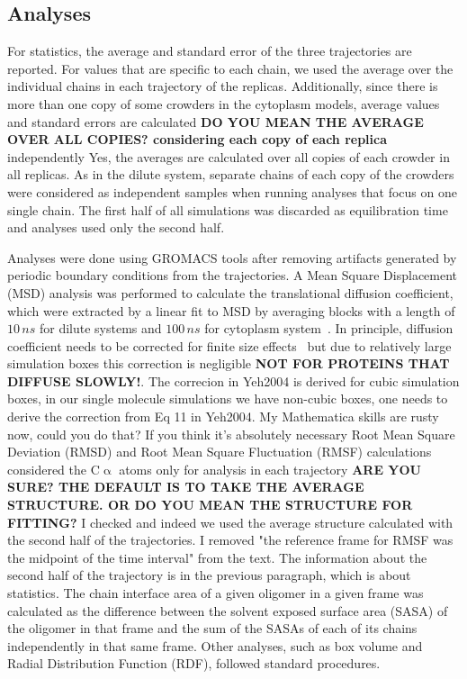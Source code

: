\documentclass[journal=jcisd8,manuscript=article]{achemso}
\begin{document}
\subsection{Analyses}
For statistics, the average and standard error of the three trajectories are reported. For values that
are specific to each chain, we used the average over the individual
chains in each trajectory of the replicas. Additionally, since there
is more than one copy of some crowders in the cytoplasm models,
average values and standard errors are calculated {\bf DO YOU MEAN THE
  AVERAGE OVER ALL COPIES? considering each copy of each replica}
independently {\color{blue} Yes, the averages are calculated over all copies of each crowder in all replicas}. As in the dilute system, separate chains of each copy
of the crowders were considered as independent samples when running
analyses that focus on one single chain. The first half of all
simulations was discarded as equilibration time and analyses used only
the second half.

Analyses were done using GROMACS tools after removing artifacts
generated by periodic boundary conditions from the trajectories. A
Mean Square Displacement (MSD) analysis was performed to calculate the
translational diffusion coefficient, which were extracted by a linear
fit to MSD by averaging blocks with a length of $10\, ns$ for dilute systems and $100\, ns$ 
for cytoplasm system~\cite{Allen1987a}. In principle, diffusion
coefficient needs to be corrected for finite size
effects~\cite{Yeh2004} but due to relatively large simulation boxes
this correction is negligible {\bf NOT FOR PROTEINS THAT DIFFUSE
  SLOWLY!}. {\color{blue} The correcion in Yeh2004 is derived for cubic simulation boxes, in our single molecule simulations we have non-cubic boxes, one needs to derive the correction from Eq 11 in Yeh2004. My Mathematica skills are rusty now, could you do that? If you think it's absolutely necessary} Root Mean Square Deviation (RMSD) and Root Mean Square
Fluctuation (RMSF) calculations considered the C$\upalpha$ atoms only for analysis in each trajectory
{\bf ARE YOU SURE? THE DEFAULT IS TO TAKE THE AVERAGE STRUCTURE. OR DO
  YOU MEAN THE STRUCTURE FOR FITTING?} {\color{blue} I checked and indeed we used the average structure calculated with the second half of the trajectories. I removed "the reference frame for RMSF was the midpoint of the time interval" from the text. The information about the second half of the trajectory is in the previous paragraph, which is about statistics}. The chain interface area of a given oligomer in a given
frame was calculated as the difference between the solvent exposed
surface area (SASA) of the oligomer in that frame and the sum of the
SASAs of each of its chains independently in that same frame. Other
analyses, such as box volume and Radial Distribution Function (RDF),
followed standard procedures.
\end{document}
